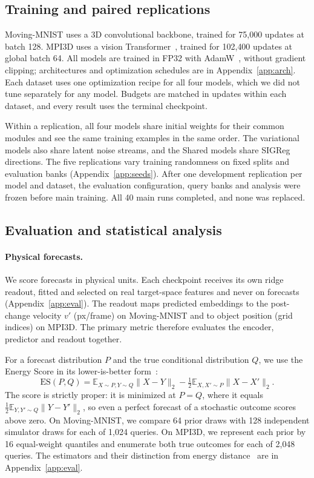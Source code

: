 \subsection{Training and paired replications}
\label{sec:training}

Moving-MNIST uses a 3D convolutional backbone, trained for 75{,}000 updates at batch 128. MPI3D uses a vision Transformer~\citep{dosovitskiy2021vit}, trained for 102{,}400 updates at global batch 64. All models are trained in FP32 with AdamW~\citep{loshchilov2019adamw}, without gradient clipping; architectures and optimization schedules are in Appendix~\ref{app:arch}. Each dataset uses one optimization recipe for all four models, which we did not tune separately for any model. Budgets are matched in updates within each dataset, and every result uses the terminal checkpoint.

Within a replication, all four models share initial weights for their common modules and see the same training examples in the same order. The variational models also share latent noise streams, and the Shared models share SIGReg directions. The five replications vary training randomness on fixed splits and evaluation banks (Appendix~\ref{app:seeds}). After one development replication per model and dataset, the evaluation configuration, query banks and analysis were frozen before main training. All 40 main runs completed, and none was replaced.

\subsection{Evaluation and statistical analysis}
\label{sec:evaluation}
\label{sec:controls}
\label{sec:stats}

\paragraph{Physical forecasts.} We score forecasts in physical units. Each checkpoint receives its own ridge readout, fitted and selected on real target-space features and never on forecasts (Appendix~\ref{app:eval}). The readout maps predicted embeddings to the post-change velocity $v'$ (px/frame) on Moving-MNIST and to object position (grid indices) on MPI3D. The primary metric therefore evaluates the encoder, predictor and readout together.

For a forecast distribution $P$ and the true conditional distribution $Q$, we use the Energy Score in its lower-is-better form~\citep{gneiting2007scoring}:
\begin{equation}
\label{eq:es}
\mathrm{ES}(P,Q)=\mathbb E_{X\sim P,Y\sim Q}\|X-Y\|_2-\tfrac12\mathbb E_{X,X'\sim P}\|X-X'\|_2.
\end{equation}
The score is strictly proper: it is minimized at $P=Q$, where it equals $\tfrac12\mathbb E_{Y,Y'\sim Q}\|Y-Y'\|_2$, so even a perfect forecast of a stochastic outcome scores above zero. On Moving-MNIST, we compare 64 prior draws with 128 independent simulator draws for each of 1{,}024 queries. On MPI3D, we represent each prior by 16 equal-weight quantiles and enumerate both true outcomes for each of 2{,}048 queries. The estimators and their distinction from energy distance~\citep{szekely2013energy} are in Appendix~\ref{app:eval}.

